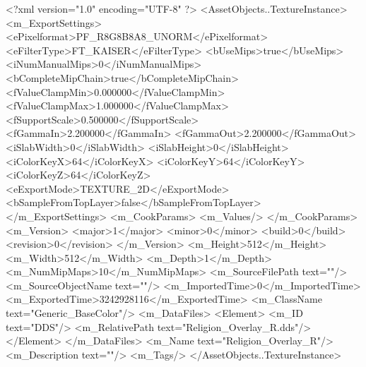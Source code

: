 <?xml version="1.0" encoding="UTF-8" ?>
<AssetObjects..TextureInstance>
	<m_ExportSettings>
		<ePixelformat>PF_R8G8B8A8_UNORM</ePixelformat>
		<eFilterType>FT_KAISER</eFilterType>
		<bUseMips>true</bUseMips>
		<iNumManualMips>0</iNumManualMips>
		<bCompleteMipChain>true</bCompleteMipChain>
		<fValueClampMin>0.000000</fValueClampMin>
		<fValueClampMax>1.000000</fValueClampMax>
		<fSupportScale>0.500000</fSupportScale>
		<fGammaIn>2.200000</fGammaIn>
		<fGammaOut>2.200000</fGammaOut>
		<iSlabWidth>0</iSlabWidth>
		<iSlabHeight>0</iSlabHeight>
		<iColorKeyX>64</iColorKeyX>
		<iColorKeyY>64</iColorKeyY>
		<iColorKeyZ>64</iColorKeyZ>
		<eExportMode>TEXTURE_2D</eExportMode>
		<bSampleFromTopLayer>false</bSampleFromTopLayer>
	</m_ExportSettings>
	<m_CookParams>
		<m_Values/>
	</m_CookParams>
	<m_Version>
		<major>1</major>
		<minor>0</minor>
		<build>0</build>
		<revision>0</revision>
	</m_Version>
	<m_Height>512</m_Height>
	<m_Width>512</m_Width>
	<m_Depth>1</m_Depth>
	<m_NumMipMaps>10</m_NumMipMaps>
	<m_SourceFilePath text=""/>
	<m_SourceObjectName text=""/>
	<m_ImportedTime>0</m_ImportedTime>
	<m_ExportedTime>3242928116</m_ExportedTime>
	<m_ClassName text="Generic_BaseColor"/>
	<m_DataFiles>
		<Element>
			<m_ID text="DDS"/>
			<m_RelativePath text="Religion_Overlay_{R}.dds"/>
		</Element>
	</m_DataFiles>
	<m_Name text="Religion_Overlay_{R}"/>
	<m_Description text=""/>
	<m_Tags/>
</AssetObjects..TextureInstance>

